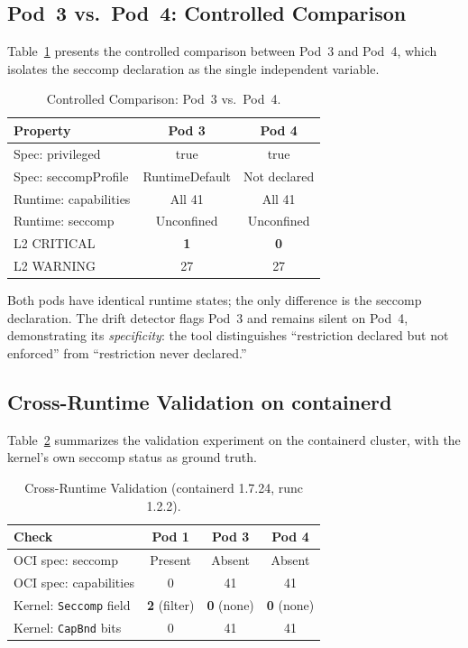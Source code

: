 \documentclass[sigconf]{acmart}
\begin{document}
\subsection{Pod~3 vs.\ Pod~4: Controlled Comparison}

Table~\ref{tab:comparison} presents the controlled comparison between Pod~3 and Pod~4, which isolates the seccomp declaration as the single independent variable.

\begin{table}[htbp]
\caption{Controlled Comparison: Pod~3 vs.\ Pod~4.}
\label{tab:comparison}
\centering
\begin{tabular}{lcc}
\toprule
\textbf{Property} & \textbf{Pod 3} & \textbf{Pod 4} \\
\midrule
Spec: privileged     & true & true \\
Spec: seccompProfile & RuntimeDefault & Not declared \\
Runtime: capabilities & All 41 & All 41 \\
Runtime: seccomp     & Unconfined & Unconfined \\
L2 CRITICAL          & \textbf{1} & \textbf{0} \\
L2 WARNING           & 27 & 27 \\
\bottomrule
\end{tabular}
\end{table}

Both pods have identical runtime states; the only difference is the seccomp declaration. The drift detector flags Pod~3 and remains silent on Pod~4, demonstrating its \emph{specificity}: the tool distinguishes ``restriction declared but not enforced'' from ``restriction never declared.''

\subsection{Cross-Runtime Validation on containerd}
\label{sec:crossruntime}

Table~\ref{tab:crossruntime} summarizes the validation experiment on the containerd cluster, with the kernel's own seccomp status as ground truth.

\begin{table}[htbp]
\caption{Cross-Runtime Validation (containerd 1.7.24, runc 1.2.2).}
\label{tab:crossruntime}
\centering
\begin{tabular}{lccc}
\toprule
\textbf{Check} & \textbf{Pod 1} & \textbf{Pod 3} & \textbf{Pod 4} \\
\midrule
OCI spec: seccomp     & Present & Absent & Absent \\
OCI spec: capabilities & 0 & 41 & 41 \\
Kernel: \texttt{Seccomp} field & \textbf{2} (filter) & \textbf{0} (none) & \textbf{0} (none) \\
Kernel: \texttt{CapBnd} bits  & 0 & 41 & 41 \\
\bottomrule
\end{tabular}
\end{table}
\end{document}
